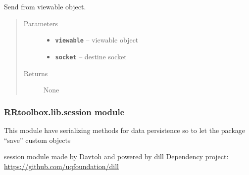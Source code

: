 \documentclass[letterpaper,10pt,english]{sphinxmanual}
\begin{document}

\begin{fulllineitems}
\label{RRtoolbox.lib:RRtoolbox.lib.serverServices.send_from}
Send from viewable object.
\begin{quote}\begin{description}
\item[{Parameters}] \leavevmode\begin{itemize}
\item {} 
\textbf{\texttt{viewable}} -- viewable object

\item {} 
\textbf{\texttt{socket}} -- destine socket

\end{itemize}

\item[{Returns}] \leavevmode
None

\end{description}\end{quote}

\end{fulllineitems}


\begin{fulllineitems}
\label{RRtoolbox.lib:RRtoolbox.lib.serverServices.string_is_socket_address}
\end{fulllineitems}



\subsubsection{RRtoolbox.lib.session module}
\label{RRtoolbox.lib:module-RRtoolbox.lib.session}\label{RRtoolbox.lib:rrtoolbox-lib-session-module}
This module have serializing methods for data persistence so to let the package ``save'' custom objects

session module made by Davtoh and powered by dill
Dependency project: \href{https://github.com/uqfoundation/dill}{https://github.com/uqfoundation/dill}
\end{document}
